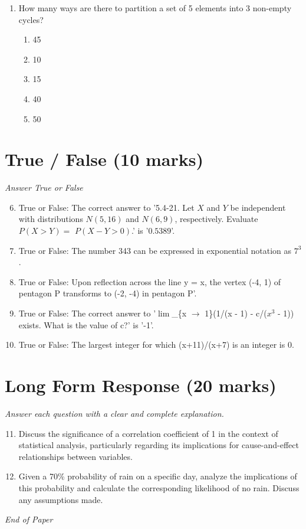 \documentclass[12pt]{article}
\begin{document}
\begin{enumerate}[label=\arabic*.]
\begin{enumerate}[label=(\alph*)]
    \item 0
    \item -1
    \item 1
    \item 2
    \item -2
\end{enumerate}
\item How many ways are there to partition a set of 5 elements into 3 non-empty cycles?
\begin{enumerate}[label=(\alph*)]
    \item 45
    \item 10
    \item 15
    \item 40
    \item 50
\end{enumerate}
\end{enumerate}

\section*{True / False (10 marks)}
\textit{Answer True or False}
\begin{enumerate}[label=\arabic*.]
\setcounter{enumi}{5}
\item True or False: The correct answer to '5.4-21. Let $X$ and $Y$ be independent with distributions $N(5,16)$ and $N(6,9)$, respectively. Evaluate $P(X>Y)=$ $P(X-Y>0)$.' is '$0.5389$'.
\item True or False: The number 343 can be expressed in exponential notation as $7^3$.
\item True or False: Upon reflection across the line y = x, the vertex (-4, 1) of pentagon P transforms to (-2, -4) in pentagon P'.
\item True or False: The correct answer to '\ensuremath{\lim}\_\{x \ensuremath{\to} 1\}(1/(x - 1) - c/($x^3$ - 1)) exists. What is the value of c?' is '-1'.
\item True or False: The largest integer for which (x+11)/(x+7) is an integer is 0.
\end{enumerate}

\section*{Long Form Response (20 marks)}
\textit{Answer each question with a clear and complete explanation.}
\begin{enumerate}[label=\arabic*.]
\setcounter{enumi}{10}
\item Discuss the significance of a correlation coefficient of 1 in the context of statistical analysis, particularly regarding its implications for cause-and-effect relationships between variables.
\item Given a 70\% probability of rain on a specific day, analyze the implications of this probability and calculate the corresponding likelihood of no rain. Discuss any assumptions made.
\end{enumerate}

\vfill
\noindent\textit{End of Paper}
\end{document}
